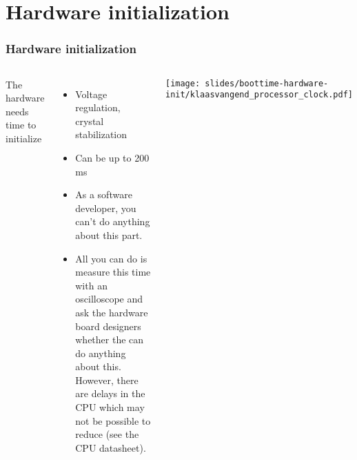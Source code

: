 \section{Hardware initialization}

\begin{frame}
\frametitle{Hardware initialization}
\begin{columns}
The hardware needs time to initialize
\begin{itemize}
\item Voltage regulation, crystal stabilization
\item Can be up to 200 ms
\item As a software developer, you can't do anything about this part.
\item All you can do is measure this time with an oscilloscope and
      ask the hardware board designers whether the can do anything about
      this. However, there are delays in the CPU which may not be
      possible to reduce (see the CPU datasheet).
\end{itemize}
\texttt{[image: slides/boottime-hardware-init/klaasvangend\_processor\_clock.pdf]}
\end{columns}
\end{frame}

